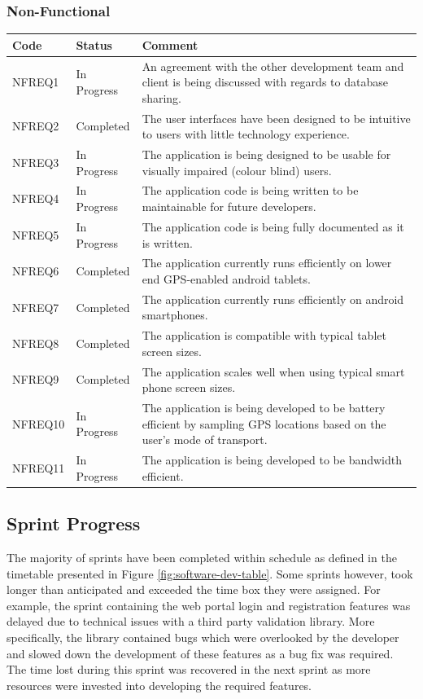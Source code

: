 \documentclass[11pt,a4paper]{article}
\begin{document}
\subsubsection{Non-Functional}
\label{sec:non-func-reqs}

\begin{longtable}{ p{}|p{}|p{} }
\textbf{Code} & \textbf{Status} & \textbf{Comment} \\

\hline
NFREQ1 & In Progress & An agreement with the other development team and client is being discussed with regards to database sharing. \\ \hline
NFREQ2 & Completed & The user interfaces have been designed to be intuitive to users with little technology experience. \\ \hline
NFREQ3 & In Progress & The application is being designed to be usable for visually impaired (colour blind) users. \\ \hline
NFREQ4 & In Progress & The application code is being written to be maintainable for future developers. \\ \hline
NFREQ5 & In Progress & The application code is being fully documented as it is written. \\ \hline
NFREQ6 & Completed & The application currently runs efficiently on lower end GPS-enabled android tablets. \\ \hline
NFREQ7 & Completed & The application currently runs efficiently on android smartphones. \\ \hline
NFREQ8 & Completed & The application is compatible with typical tablet screen sizes. \\ \hline
NFREQ9 & Completed & The application scales well when using typical smart phone screen sizes. \\ \hline
NFREQ10 & In Progress & The application is being developed to be battery efficient by sampling GPS locations based on the user's mode of transport. \\ \hline
NFREQ11 & In Progress & The application is being developed to be bandwidth efficient. \\ \hline
\end{longtable}

\subsection{Sprint Progress}
The majority of sprints have been completed within schedule as defined in the timetable presented in Figure \ref{fig:software-dev-table}. Some sprints however, took longer than anticipated and exceeded the time box they were assigned. For example, the sprint containing the web portal login and registration features was delayed due to technical issues with a third party validation library. More specifically, the library contained bugs which were overlooked by the developer and slowed down the development of these features as a bug fix was required. The time lost during this sprint was recovered in the next sprint as more resources were invested into developing the required features.
\end{document}
